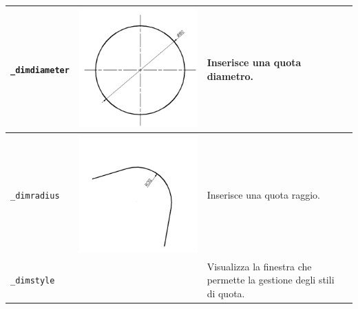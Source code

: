 \documentclass[..]{../IEEEphot}
\begin{document}
\begin{center}
\begin{longtable}{m{.2\linewidth}m{.2\linewidth}m{.25\linewidth}m{.25\linewidth}}
\\
\midrule
\texttt{\_dimdiameter} & \includegraphics[width = 0.8\linewidth, keepaspectratio]{../images/jpg/_dimdiameter.jpg} & Inserisce una quota diametro. & 
\\
\midrule
\texttt{\_dimradius} & \includegraphics[width = 0.8\linewidth, keepaspectratio]{../images/jpg/_dimradius.jpg} & Inserisce una quota raggio. & 
\\
\midrule
\texttt{\_dimstyle} & & Visualizza la finestra che permette la gestione degli stili di quota. & 
\\
\bottomrule
\end{longtable}
\end{center}
\end{document}
